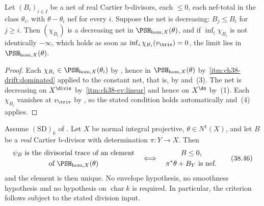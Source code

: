 \begin{corollary}
\label{cor:ch38-realization-monotone}
Let $(B_i)_{i\in I}$ be a net of real Cartier b-divisors, each
$\leq0$, each nef-total in the class $\theta_i$, with
$\theta-\theta_i$ nef for every $i$.  Suppose the net is decreasing:
$B_j\leq B_i$ for $j\geq i$.  Then $(\chi_{B_i})$ is a decreasing net
in $\PSH_{\mathrm{hom},X}(\theta)$, and if
$\inf_i\chi_{B_i}$ is not identically $-\infty$, which holds
as soon as $\inf_i\chi_{B_i}(v_{\triv})=0$, the limit lies in
$\PSH_{\mathrm{hom},X}(\theta)$.
\end{corollary}

\begin{proof}
Each $\chi_{B_i}\in\PSH_{\mathrm{hom},X}(\theta_i)$ by
, hence in
$\PSH_{\mathrm{hom},X}(\theta)$ by
\,\cref{itm:ch38-drift:dominated} applied to
the constant net, that is, by
 and \,(3).  The net
is decreasing on $X^{\divis}$ by
\,\cref{itm:ch38-ev:linear} and
hence on $X^{\An}$ by
\,(1).  Each $\chi_{B_i}$
vanishes at $v_{\triv}$ by
, so the stated condition holds
automatically and \,(4) applies.
\end{proof}

\begin{corollary}
\label{cor:ch38-cartier-psh-criterion-unconditional}
Assume $\mathrm{(SD)}_k$ of .
Let $X$ be normal integral projective, $\theta\in N^1(X)$, and let
$B$ be a \emph{real} Cartier b-divisor with determination
$\pi:Y\to X$.  Then
\[
 \begin{gathered}
 \psi_B\ \text{is the divisorial trace of an element}\\
 \text{of }\PSH_{\mathrm{hom},X}(\theta)
 \end{gathered}
 \quad\Longleftrightarrow\quad
 \begin{gathered}
 B\leq0,\\
 \pi^*\theta+B_Y\ \text{is nef}.
 \end{gathered}
\tag{38.46}\label{eq:ch38-unconditional-criterion}
\]
and the element is then unique.  No envelope hypothesis, no smoothness
hypothesis and no hypothesis on $\operatorname{char}k$ is required.  In
particular, the criterion follows subject to the stated division input.
\end{corollary}

